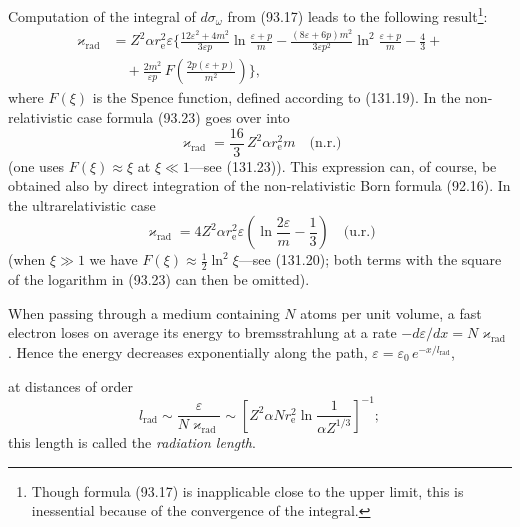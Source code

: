 Computation of the integral of $d\sigma_\omega$ from (93.17) leads to the following result\footnote{Though formula (93.17) is inapplicable close to the upper limit, this is inessential because of the convergence of the integral.}:
\begin{equation}
\begin{split}
\varkappa_\text{rad} &= Z^2\alpha r_\mathrm{e}^2\varepsilon\biggl\{\frac{12\varepsilon^2 + 4m^2}{3\varepsilon p}\ln\frac{\varepsilon+p}{m} - \frac{(8\varepsilon + 6p)m^2}{3\varepsilon p^2}\ln^2\frac{\varepsilon+p}{m} - \frac{4}{3} + {} \\
&\quad {} + \frac{2m^2}{\varepsilon p}\,F\!\left(\frac{2p(\varepsilon+p)}{m^2}\right)\biggr\},
\end{split}
\label{eq:93.23}
\end{equation}
where $F(\xi)$ is the Spence function, defined according to (131.19). In the non-relativistic case formula (93.23) goes over into
\begin{equation}
\varkappa_\text{rad} = \frac{16}{3}\,Z^2\alpha r_\mathrm{e}^2 m \quad \text{(n.r.)}
\label{eq:93.24}
\end{equation}
(one uses $F(\xi) \approx \xi$ at $\xi \ll 1$---see (131.23)). This expression can, of course, be obtained also by direct integration of the non-relativistic Born formula (92.16). In the ultrarelativistic case
\begin{equation}
\varkappa_\text{rad} = 4Z^2\alpha r_\mathrm{e}^2\varepsilon\left(\ln\frac{2\varepsilon}{m} - \frac{1}{3}\right) \quad \text{(u.r.)}
\label{eq:93.25}
\end{equation}
(when $\xi \gg 1$ we have $F(\xi) \approx \frac{1}{2}\ln^2\xi$---see (131.20); both terms with the square of the logarithm in (93.23) can then be omitted).

When passing through a medium containing $N$ atoms per unit volume, a fast electron loses on average its energy to bremsstrahlung at a rate $-d\varepsilon/dx = N\varkappa_\text{rad}$. Hence the energy decreases exponentially along the path, $\varepsilon = \varepsilon_0\,e^{-x/l_\text{rad}}$,


at distances of order
\begin{equation}
l_\text{rad} \sim \frac{\varepsilon}{N\varkappa_\text{rad}} \sim \left[Z^2\alpha N r_\mathrm{e}^2\ln\frac{1}{\alpha Z^{1/3}}\right]^{-1};
\label{eq:93.26}
\end{equation}
this length is called the \emph{radiation length}.

